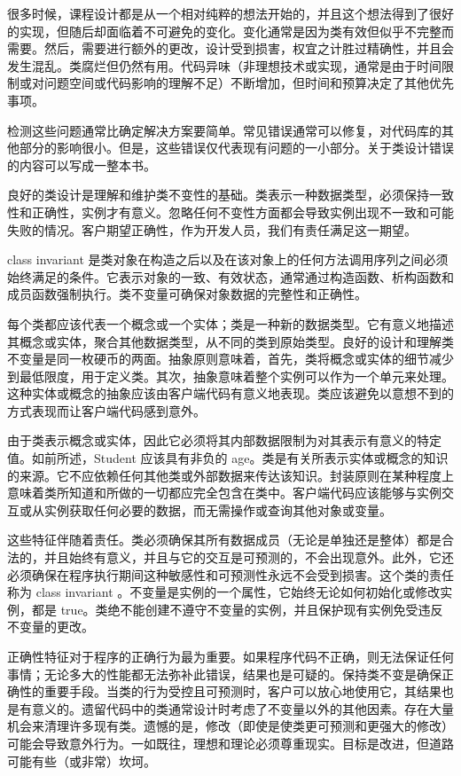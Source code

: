 
很多时候，课程设计都是从一个相对纯粹的想法开始的，并且这个想法得到了很好的实现，但随后却面临着不可避免的变化。变化通常是因为类有效但似乎不完整而需要。然后，需要进行额外的更改，设计受到损害，权宜之计胜过精确性，并且会发生混乱。类腐烂但仍然有用。代码异味（非理想技术或实现，通常是由于时间限制或对问题空间或代码影响的理解不足）不断增加，但时间和预算决定了其他优先事项。

检测这些问题通常比确定解决方案要简单。常见错误通常可以修复，对代码库的其他部分的影响很小。但是，这些错误仅代表现有问题的一小部分。关于类设计错误的内容可以写成一整本书。

良好的类设计是理解和维护类不变性的基础。类表示一种数据类型，必须保持一致性和正确性，实例才有意义。忽略任何不变性方面都会导致实例出现不一致和可能失败的情况。客户期望正确性，作为开发人员，我们有责任满足这一期望。


class invariant 是类对象在构造之后以及在该对象上的任何方法调用序列之间必须始终满足的条件。它表示对象的一致、有效状态，通常通过构造函数、析构函数和成员函数强制执行。类不变量可确保对象数据的完整性和正确性。

每个类都应该代表一个概念或一个实体；类是一种新的数据类型。它有意义地描述其概念或实体，聚合其他数据类型，从不同的类到原始类型。良好的设计和理解类不变量是同一枚硬币的两面。抽象原则意味着，首先，类将概念或实体的细节减少到最低限度，用于定义类。其次，抽象意味着整个实例可以作为一个单元来处理。这种实体或概念的抽象应该由客户端代码有意义地表现。类应该避免以意想不到的方式表现而让客户端代码感到意外。

由于类表示概念或实体，因此它必须将其内部数据限制为对其表示有意义的特定值。如前所述，Student 应该具有非负的 age。类是有关所表示实体或概念的知识的来源。它不应依赖任何其他类或外部数据来传达该知识。封装原则在某种程度上意味着类所知道和所做的一切都应完全包含在类中。客户端代码应该能够与实例交互或从实例获取任何必要的数据，而无需操作或查询其他对象或变量。

这些特征伴随着责任。类必须确保其所有数据成员（无论是单独还是整体）都是合法的，并且始终有意义，并且与它的交互是可预测的，不会出现意外。此外，它还必须确保在程序执行期间这种敏感性和可预测性永远不会受到损害。这个类的责任称为 class invariant 。不变量是实例的一个属性，它始终无论如何初始化或修改实例，都是 true。类绝不能创建不遵守不变量的实例，并且保护现有实例免受违反不变量的更改。

正确性特征对于程序的正确行为最为重要。如果程序代码不正确，则无法保证任何事情；无论多大的性能都无法弥补此错误，结果也是可疑的。保持类不变是确保正确性的重要手段。当类的行为受控且可预测时，客户可以放心地使用它，其结果也是有意义的。遗留代码中的类通常设计时考虑了不变量以外的其他因素。存在大量机会来清理许多现有类。遗憾的是，修改（即使是使类更可预测和更强大的修改） 可能会导致意外行为。一如既往，理想和理论必须尊重现实。目标是改进，但道路可能有些（或非常）坎坷。

